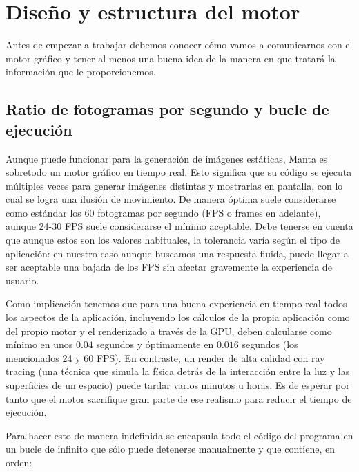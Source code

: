 \section{Diseño y estructura del motor}

Antes de empezar a trabajar debemos conocer cómo vamos a comunicarnos con el motor gráfico y tener al menos una buena idea de la manera en que tratará la información que le proporcionemos.

\subsection{Ratio de fotogramas por segundo y bucle de ejecución}
\label{fps_bucle_ejecucion}
Aunque puede funcionar para la generación de imágenes estáticas, Manta es sobretodo un motor gráfico en tiempo real. Esto significa que su código se ejecuta múltiples veces para generar imágenes distintas y mostrarlas en pantalla, con lo cual se logra una ilusión de movimiento. De manera óptima suele considerarse como estándar los 60 fotogramas por segundo (FPS o frames en adelante), aunque 24-30 FPS suele considerarse el mínimo aceptable. Debe tenerse en cuenta que aunque estos son los valores habituales, la tolerancia varía según el tipo de aplicación: en nuestro caso aunque buscamos una respuesta fluida, puede llegar a ser aceptable una bajada de los FPS sin afectar gravemente la experiencia de usuario.

Como implicación tenemos que para una buena experiencia en tiempo real todos los aspectos de la aplicación, incluyendo los cálculos de la propia aplicación como del propio motor y el renderizado a través de la GPU, deben calcularse como mínimo en unos $0.04$ segundos y óptimamente en $0.016$ segundos (los mencionados 24 y 60 FPS). En contraste, un render de alta calidad con ray tracing (una técnica que simula la física detrás de la interacción entre la luz y las superficies de un espacio) puede tardar varios minutos u horas. Es de esperar por tanto que el motor sacrifique gran parte de ese realismo para reducir el tiempo de ejecución.

Para hacer esto de manera indefinida se encapsula todo el código del programa en un bucle de infinito que sólo puede detenerse manualmente y que contiene, en orden:

